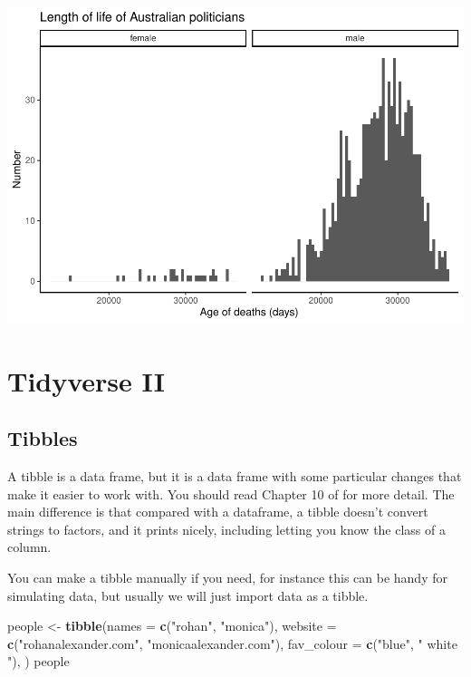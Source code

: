 \documentclass[
]{book}
\newenvironment{Shaded}{\begin{snugshade}}{\end{snugshade}}
\newcommand{\DataTypeTok}[1]{\textcolor[rgb]{0.13,0.29,0.53}{#1}}
\newcommand{\KeywordTok}[1]{\textcolor[rgb]{0.13,0.29,0.53}{\textbf{#1}}}
\newcommand{\NormalTok}[1]{#1}
\newcommand{\StringTok}[1]{\textcolor[rgb]{0.31,0.60,0.02}{#1}}
\begin{document}
\includegraphics{telling_stories_with_data_files/figure-latex/unnamed-chunk-67-1.pdf}

\hypertarget{tidyverse-ii}{%
\section{Tidyverse II}\label{tidyverse-ii}}

\hypertarget{tibbles}{%
\subsection{Tibbles}\label{tibbles}}

A tibble is a data frame, but it is a data frame with some particular changes that make it easier to work with. You should read Chapter 10 of \citet{r4ds} for more detail. The main difference is that compared with a dataframe, a tibble doesn't convert strings to factors, and it prints nicely, including letting you know the class of a column.

You can make a tibble manually if you need, for instance this can be handy for simulating data, but usually we will just import data as a tibble.

\begin{Shaded}
\begin{Highlighting}[]
\NormalTok{people <-}\StringTok{ }
\StringTok{  }\KeywordTok{tibble}\NormalTok{(}\DataTypeTok{names =} \KeywordTok{c}\NormalTok{(}\StringTok{"rohan"}\NormalTok{, }\StringTok{"monica"}\NormalTok{),}
         \DataTypeTok{website =} \KeywordTok{c}\NormalTok{(}\StringTok{"rohanalexander.com"}\NormalTok{, }\StringTok{"monicaalexander.com"}\NormalTok{),}
         \DataTypeTok{fav_colour =} \KeywordTok{c}\NormalTok{(}\StringTok{"blue"}\NormalTok{, }\StringTok{" white "}\NormalTok{),}
\NormalTok{         )}
\NormalTok{people}
\end{Highlighting}
\end{Shaded}
\end{document}

